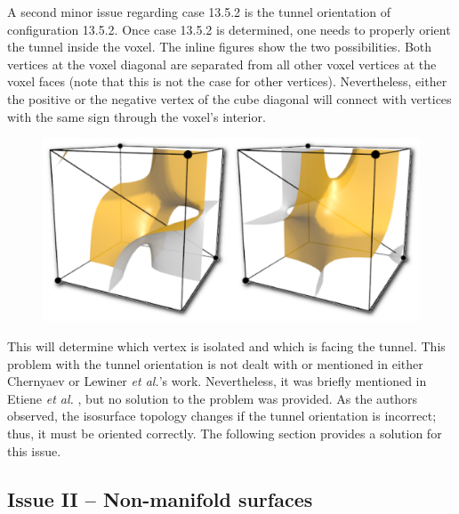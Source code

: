 A second minor issue regarding case 13.5.2 is the tunnel orientation of configuration 13.5.2. Once case 13.5.2 is determined, one needs to properly orient the tunnel inside the voxel. The inline figures show the two possibilities. Both vertices at the voxel diagonal are separated from all other voxel vertices at the voxel faces (note that this is not the case for other vertices). Nevertheless, either the positive or the negative vertex of the cube diagonal will connect with vertices with the same sign through the voxel's interior. 
\begin{figure}
     \includegraphics[width=0.9\linewidth]{chapter4/figures/tunnel.png}
\end{figure}
This will determine which vertex is isolated and which is facing the tunnel. This problem with the tunnel orientation is not dealt with or mentioned in either Chernyaev or Lewiner \emph{et al.}'s work. Nevertheless, it was briefly mentioned in Etiene \emph{et al.} \cite{Etiene:2012:TVI:2197070.2197097}, but no solution to the problem was provided. As the authors observed, the isosurface topology changes if the tunnel orientation is incorrect; thus, it must be oriented correctly. The following section provides a solution for this issue.

\subsection{Issue II -- Non-manifold surfaces}
\label{sec:non-manifold-surfaces}

